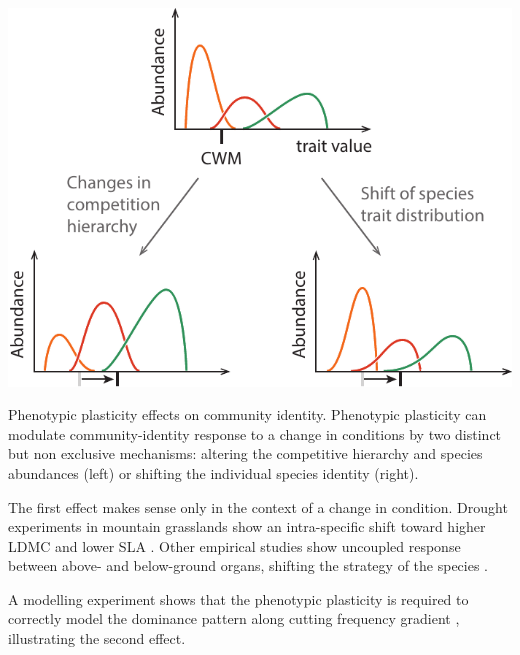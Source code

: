 {\begin{marginfigure}
    \includegraphics{./1_Introduction/graphics/identity_shift.pdf}
  \caption[Identity shift]{Phenotypic plasticity effects on community identity. Phenotypic plasticity can modulate community-identity response to a change in conditions by two distinct but non exclusive mechanisms: altering the competitive hierarchy and species abundances (left) or shifting the individual species identity (right)\parencite{dwyer_specific_2014}.}
  \label{fg:insurance}
\end{marginfigure}

The first effect makes sense only in the context of a change in condition. Drought experiments in mountain grasslands show an intra-specific shift toward higher LDMC and lower SLA \parencite{jung_intraspecific_2014}. Other empirical studies show uncoupled response between above- and below-ground organs, shifting the strategy of the species \parencite{freschett_plasticity_2014}.

A modelling experiment shows that the phenotypic plasticity is required to correctly model the dominance pattern along cutting frequency gradient \parencite{maire_plasticity_2013}, illustrating the second effect. 




}
